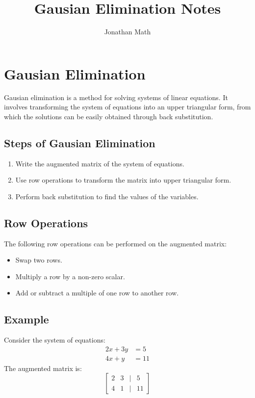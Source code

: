 \documentclass{article}
\title{\vspace{-2cm}Gausian Elimination Notes}
\author{Jonathan Math}
\date{}
\begin{document}
\maketitle

\section*{Gausian Elimination}
Gausian elimination is a method for solving systems of linear equations. It involves transforming the system
of equations into an upper triangular form, from which the solutions can be easily obtained through back substitution.

\subsection*{Steps of Gausian Elimination}
\begin{enumerate}
    \item Write the augmented matrix of the system of equations.
    \item Use row operations to transform the matrix into upper triangular form.
    \item Perform back substitution to find the values of the variables.
\end{enumerate}

\subsection*{Row Operations}
The following row operations can be performed on the augmented matrix:
\begin{itemize}
    \item Swap two rows.
    \item Multiply a row by a non-zero scalar.
    \item Add or subtract a multiple of one row to another row.
\end{itemize}

\subsection*{Example}
Consider the system of equations:
\begin{align*}
    2x + 3y &= 5 \\
    4x + y &= 11
\end{align*}
The augmented matrix is:
\[  \begin{bmatrix}
    2 & 3 & | & 5 \\
    4 & 1 & | & 11
\end{bmatrix} \]
\end{document}
